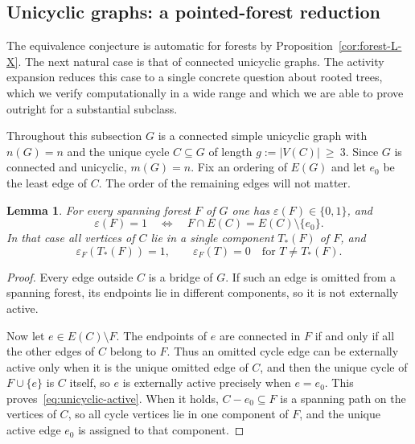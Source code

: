 \documentclass[11pt]{article}
\theoremstyle{plain}
\newtheorem{lemma}[theorem]{Lemma}
\theoremstyle{definition}
\newcommand{\eps}{\varepsilon}
\numberwithin{equation}{section}
\begin{document}
\subsection{Unicyclic graphs: a pointed-forest reduction}
\label{subsec:unicyclic}

The equivalence conjecture is automatic for forests by
Proposition~\ref{cor:forest-L-X}.  The next natural case is that of connected
unicyclic graphs.  The activity expansion reduces this case to a single
concrete question about rooted trees, which we verify computationally in a
wide range and which we are able to prove outright for a substantial
subclass.

Throughout this subsection $G$ is a connected simple unicyclic graph with $n(G)=n$ and
the unique cycle $C\subseteq G$ of length
$   g:=|V(C)|\ \ge\ 3.$
Since $G$ is connected and unicyclic,
$m(G)=n$.  Fix an ordering of $E(G)$ and let $e_0$ be the least edge of $C$.
The order of the remaining edges will not matter.

\begin{lemma}\label{lem:unicyclic-activity}
For every spanning forest $F$ of $G$ one has $\eps(F)\in\{0,1\}$, and
\begin{equation}\label{eq:unicyclic-active}
   \eps(F)=1
   \quad\Longleftrightarrow\quad
   F\cap E(C)=E(C)\setminus\{e_0\}.
\end{equation}
In that case all vertices of $C$ lie in a single component $T_*(F)$ of $F$, and
\[
   \eps_F(T_*(F))=1,
   \qquad
   \eps_F(T)=0
   \quad\text{for }T\ne T_*(F).
\]
\end{lemma}

\begin{proof}
Every edge outside $C$ is a bridge of $G$.  If such an edge is omitted from a
spanning forest, its endpoints lie in different components, so it is not externally active.

Now let $e\in E(C)\setminus F$.  The endpoints of $e$ are connected in $F$ if
and only if all the other edges of $C$ belong to $F$.  Thus an omitted cycle
edge can be externally active only when it is the unique omitted edge of $C$,
and then the unique cycle of $F\cup\{e\}$ is $C$ itself, so $e$ is externally
active precisely when $e=e_0$.  This proves~\eqref{eq:unicyclic-active}.
When it holds, $C-e_0\subseteq F$ is a spanning path on the vertices of
$C$, so all cycle vertices lie in one component of $F$, and the unique active
edge $e_0$ is assigned to that component.
\end{proof}
\end{document}
